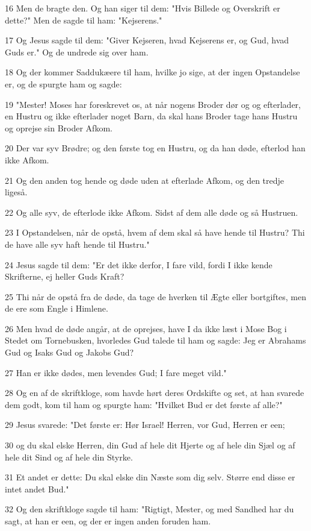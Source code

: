 \par 16 Men de bragte den. Og han siger til dem: "Hvis Billede og Overskrift er dette?" Men de sagde til ham: "Kejserens."
\par 17 Og Jesus sagde til dem: "Giver Kejseren, hvad Kejserens er, og Gud, hvad Guds er." Og de undrede sig over ham.
\par 18 Og der kommer Saddukæere til ham, hvilke jo sige, at der ingen Opstandelse er, og de spurgte ham og sagde:
\par 19 "Mester! Moses har foreskrevet os, at når nogens Broder dør og og efterlader, en Hustru og ikke efterlader noget Barn, da skal hans Broder tage hans Hustru og oprejse sin Broder Afkom.
\par 20 Der var syv Brødre; og den første tog en Hustru, og da han døde, efterlod han ikke Afkom.
\par 21 Og den anden tog hende og døde uden at efterlade Afkom, og den tredje ligeså.
\par 22 Og alle syv, de efterlode ikke Afkom. Sidst af dem alle døde og så Hustruen.
\par 23 I Opstandelsen, når de opstå, hvem af dem skal så have hende til Hustru? Thi de have alle syv haft hende til Hustru."
\par 24 Jesus sagde til dem: "Er det ikke derfor, I fare vild, fordi I ikke kende Skrifterne, ej heller Guds Kraft?
\par 25 Thi når de opstå fra de døde, da tage de hverken til Ægte eller bortgiftes, men de ere som Engle i Himlene.
\par 26 Men hvad de døde angår, at de oprejses, have I da ikke læst i Mose Bog i Stedet om Tornebusken, hvorledes Gud talede til ham og sagde: Jeg er Abrahams Gud og Isaks Gud og Jakobs Gud?
\par 27 Han er ikke dødes, men levendes Gud; I fare meget vild."
\par 28 Og en af de skriftkloge, som havde hørt deres Ordskifte og set, at han svarede dem godt, kom til ham og spurgte ham: "Hvilket Bud er det første af alle?"
\par 29 Jesus svarede: "Det første er: Hør Israel! Herren, vor Gud, Herren er een;
\par 30 og du skal elske Herren, din Gud af hele dit Hjerte og af hele din Sjæl og af hele dit Sind og af hele din Styrke.
\par 31 Et andet er dette: Du skal elske din Næste som dig selv. Større end disse er intet andet Bud."
\par 32 Og den skriftkloge sagde til ham: "Rigtigt, Mester, og med Sandhed har du sagt, at han er een, og der er ingen anden foruden ham.

